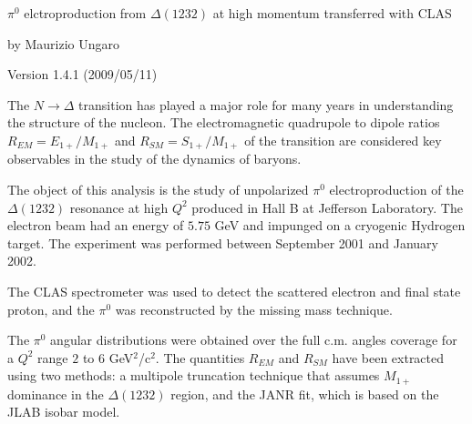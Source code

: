 
\begin{center}
 \vspace{4cm}
 \Large 
 \vspace{4cm}
 
 $\pi^0$ elctroproduction from $\Delta (1232)$ 
 at high momentum transferred with CLAS
 \end{center}


\begin{center}
 \vspace{4cm}
 by Maurizio Ungaro
\end{center}

\begin{center}
 \vspace{2cm}
Version 1.4.1 (2009/05/11)
\end{center}



 

The $N\rightarrow\Delta $ transition has played a major role
for many years
in understanding the structure of the nucleon. The electromagnetic quadrupole 
to dipole ratios $R_{EM} = E_{1+}/M_{1+}$ and $R_{SM} = S_{1+}/M_{1+}$
of the transition are considered  key observables in the study of the dynamics
of baryons.

The object of this analysis is the study of unpolarized 
$\pi^0$ electroproduction
of the $\Delta(1232)$ resonance at high $Q^2$
produced in Hall B at  Jefferson Laboratory. 
The electron beam had an energy of $5.75$ GeV and impunged on a cryogenic  Hydrogen target.
The experiment was performed between September 2001 and January 2002.

The CLAS spectrometer was used to detect the scattered electron
and final state proton, and the $\pi^0$ was reconstructed by the
missing mass technique.

The $\pi^0$ angular distributions were obtained over
the full c.m. angles coverage for a $Q^2$  range  $2$ to $6$ GeV$^2$/c$^2$.
The quantities $R_{EM}$ and $R_{SM}$ 
have been extracted using two methods: a multipole truncation technique that assumes $M_{1+}$ dominance
in the  $\Delta(1232)$ region, and the JANR fit, which is based on the JLAB isobar model.


